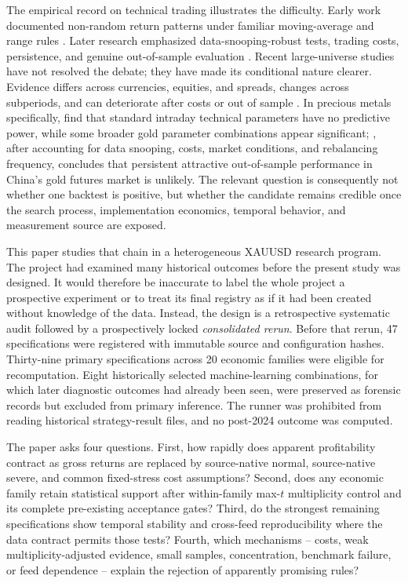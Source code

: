 The empirical record on technical trading illustrates the difficulty. Early work documented non-random return patterns under familiar moving-average and range rules \citep{brock1992}. Later research emphasized data-snooping-robust tests, trading costs, persistence, and genuine out-of-sample evaluation \citep{hsu2010,bajgrowicz2012}. Recent large-universe studies have not resolved the debate; they have made its conditional nature clearer. Evidence differs across currencies, equities, and spreads, changes across subperiods, and can deteriorate after costs or out of sample \citep{dockery2023,psaradellis2023,rink2023,song2025}. In precious metals specifically, \citet{batten2018} find that standard intraday technical parameters have no predictive power, while some broader gold parameter combinations appear significant; \citet{jin2022}, after accounting for data snooping, costs, market conditions, and rebalancing frequency, concludes that persistent attractive out-of-sample performance in China's gold futures market is unlikely. The relevant question is consequently not whether one backtest is positive, but whether the candidate remains credible once the search process, implementation economics, temporal behavior, and measurement source are exposed.

This paper studies that chain in a heterogeneous XAUUSD research program. The project had examined many historical outcomes before the present study was designed. It would therefore be inaccurate to label the whole project a prospective experiment or to treat its final registry as if it had been created without knowledge of the data. Instead, the design is a retrospective systematic audit followed by a prospectively locked \emph{consolidated rerun}. Before that rerun, 47 specifications were registered with immutable source and configuration hashes. Thirty-nine primary specifications across 20 economic families were eligible for recomputation. Eight historically selected machine-learning combinations, for which later diagnostic outcomes had already been seen, were preserved as forensic records but excluded from primary inference. The runner was prohibited from reading historical strategy-result files, and no post-2024 outcome was computed.

The paper asks four questions. First, how rapidly does apparent profitability contract as gross returns are replaced by source-native normal, source-native severe, and common fixed-stress cost assumptions? Second, does any economic family retain statistical support after within-family max-$t$ multiplicity control and its complete pre-existing acceptance gates? Third, do the strongest remaining specifications show temporal stability and cross-feed reproducibility where the data contract permits those tests? Fourth, which mechanisms -- costs, weak multiplicity-adjusted evidence, small samples, concentration, benchmark failure, or feed dependence -- explain the rejection of apparently promising rules?

